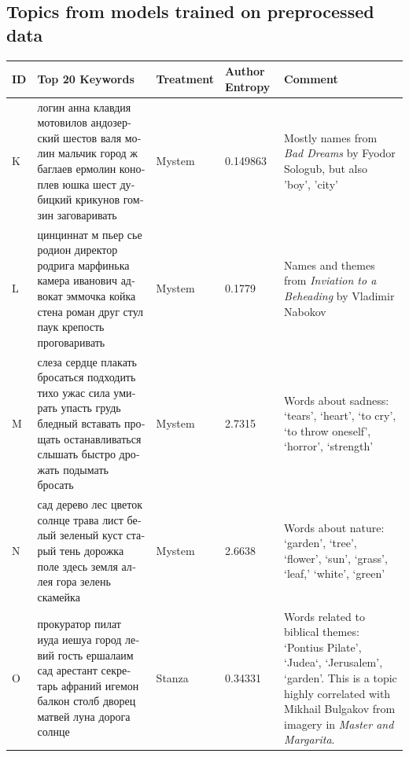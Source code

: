 \documentclass[11pt,a4paper]{article}
\begin{document}
\begin{landscape}
\section{Topics from models trained on preprocessed data}
\label{sec:preprocessed_topics}
\begin{center}
    \begin{tabularx}{\textwidth}{|l|X|l|l|X|}
    \hline
    \textbf{ID} & \textbf{Top 20 Keywords} & \textbf{Treatment} & \textbf{Author Entropy} &  \textbf{Comment} \\ \hline
    K & \foreignlanguage{russian}{логин анна клавдия мотовилов андозерский шестов валя молин мальчик город ж баглаев ермолин коноплев юшка шест дубицкий крикунов гомзин заговаривать} & Mystem & 0.149863 & Mostly names from \textit{Bad Dreams} by Fyodor Sologub, but also 'boy', 'city' \\ \hline
    L & \foreignlanguage{russian}{цинциннат м пьер сье родион директор родрига марфинька камера иванович адвокат эммочка койка стена роман друг стул паук крепость проговаривать} & Mystem & 0.1779 & Names and themes from \textit{Inviation to a Beheading} by Vladimir Nabokov \\ \hline
    M & \foreignlanguage{russian}{слеза сердце плакать бросаться подходить тихо ужас сила умирать упасть грудь бледный вставать прощать останавливаться слышать быстро дрожать подымать бросать} & Mystem & 2.7315 & Words about sadness: `tears', `heart', `to cry', `to throw oneself', `horror', `strength' \\ \hline
    N & \foreignlanguage{russian}{сад дерево лес цветок солнце трава лист белый зеленый куст старый тень дорожка поле здесь земля аллея гора зелень скамейка} & Mystem & 2.6638 & Words about nature: `garden', `tree', `flower', `sun', `grass', `leaf,' `white', `green' \\ \hline
    O & \foreignlanguage{russian}{прокуратор пилат иуда иешуа город левий гость ершалаим сад арестант секретарь афраний игемон балкон столб дворец матвей луна дорога солнце} & Stanza & 0.34331 & Words related to biblical themes: `Pontius Pilate', `Judea`, `Jerusalem', `garden'. This is a topic highly correlated with Mikhail Bulgakov from imagery in \textit{Master and Margarita}. \\ \hline

\end{tabularx}
\end{center}
\end{landscape}
\end{document}
